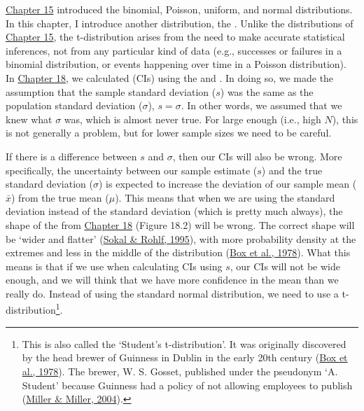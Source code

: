 \documentclass[
  openany]{krantz}
\begin{document}
\protect\hyperlink{Chapter_15}{Chapter 15} introduced the binomial, Poisson, uniform, and normal distributions.
In this chapter, I introduce another distribution, the .
Unlike the distributions of \protect\hyperlink{Chapter_15}{Chapter 15}, the t-distribution arises from the need to make accurate statistical inferences, not from any particular kind of data (e.g., successes or failures in a binomial distribution, or events happening over time in a Poisson distribution).
In \protect\hyperlink{Chapter_18}{Chapter 18}, we calculated  (CIs) using the  and .
In doing so, we made the assumption that the sample standard deviation (\(s\)) was the same as the population standard deviation (\(\sigma\)), \(s = \sigma\).
In other words, we assumed that we knew what \(\sigma\) was, which is almost never true.
For large enough  (i.e., high \(N\)), this is not generally a problem, but for lower sample sizes we need to be careful.

If there is a difference between \(s\) and \(\sigma\), then our CIs will also be wrong.
More specifically, the uncertainty between our sample estimate (\(s\)) and the true standard deviation (\(\sigma\)) is expected to increase the deviation of our sample mean (\(\bar{x}\)) from the true mean (\(\mu\)).
This means that when we are using the \emph{} standard deviation instead of the \emph{} standard deviation (which is pretty much always), the shape of the  from \protect\hyperlink{Chapter_18}{Chapter 18} (Figure 18.2) will be wrong.
The correct shape will be `wider and flatter' (\protect\hyperlink{ref-Sokal1995}{Sokal \& Rohlf, 1995}), with more probability density at the extremes and less in the middle of the distribution (\protect\hyperlink{ref-Box1978}{Box et al., 1978}).
What this means is that if we use  when calculating CIs using \(s\), our CIs will not be wide enough, and we will think that we have more confidence in the mean than we really do.
Instead of using the standard normal distribution, we need to use a t-distribution\footnote{This is also called the `Student's t-distribution'. It was originally discovered by the head brewer of Guinness in Dublin in the early 20th century (\protect\hyperlink{ref-Box1978}{Box et al., 1978}). The brewer, W. S. Gosset, published under the pseudonym `A. Student' because Guinness had a policy of not allowing employees to publish (\protect\hyperlink{ref-Miller2004}{Miller \& Miller, 2004}).}.
\end{document}
